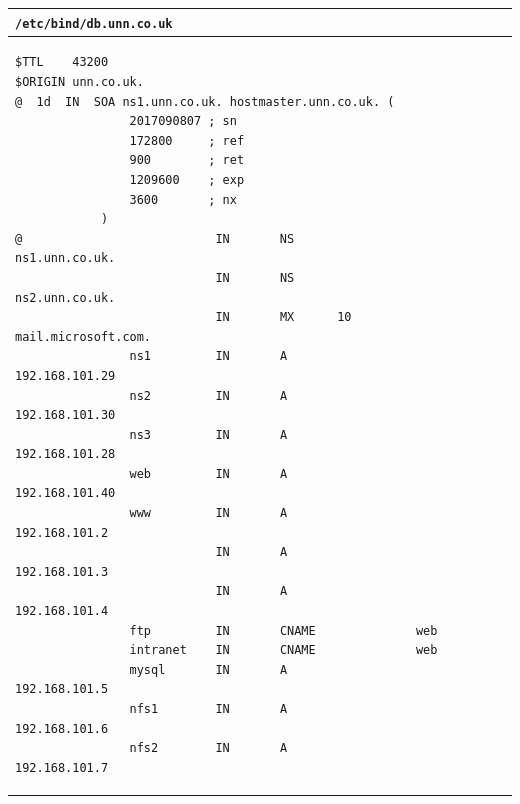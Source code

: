 \documentclass[11pt]{article}
\begin{document}
\begin{table}[ht]
    \begin{tabular}{|p{17.7cm}|} 
        \hline
        \texttt{\textbf{/etc/bind/db.unn.co.uk}}\\ 
        \hline
        \lstset{
                basicstyle=\scriptsize\ttfamily,
              }
              \begin{lstlisting}
$TTL    43200 
$ORIGIN unn.co.uk.
@  1d  IN  SOA ns1.unn.co.uk. hostmaster.unn.co.uk. (
                2017090807 ; sn
                172800     ; ref
                900        ; ret
                1209600    ; exp
                3600       ; nx
            )
@                           IN       NS                 ns1.unn.co.uk.
                            IN       NS                 ns2.unn.co.uk.
                            IN       MX      10         mail.microsoft.com.
                ns1         IN       A                  192.168.101.29
                ns2         IN       A                  192.168.101.30
                ns3         IN       A                  192.168.101.28
                web         IN       A                  192.168.101.40
                www         IN       A                  192.168.101.2
                            IN       A                  192.168.101.3
                            IN       A                  192.168.101.4
                ftp         IN       CNAME              web
                intranet    IN       CNAME              web
                mysql       IN       A                  192.168.101.5
                nfs1        IN       A                  192.168.101.6
                nfs2        IN       A                  192.168.101.7
        \end{lstlisting}\\
        \hline
    \end{tabular}
\end{table} 
\end{document}
